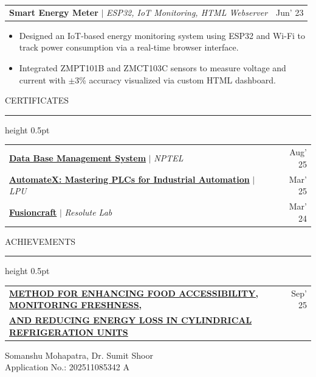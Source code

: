 \documentclass[10pt,a4paper]{article}
\newcommand{\resumeheading}[1]{
    \vspace{6pt}
    {\large\color{resblue} #1}
    \vspace{1pt}
    {\color{resblue}\hrule height 0.5pt}
    \vspace{4pt}
}
\begin{document}
\vspace{2pt}

\begin{tabularx}{\textwidth}{@{}X r@{}}
\textbf{\color{resblue} Smart Energy Meter} $|$ \textit{ESP32, IoT Monitoring, HTML Webserver} & Jun' 23
\end{tabularx}
\begin{itemize}[leftmargin=1.5em, itemsep=0pt, parsep=1pt, topsep=2pt]
    \item Designed an IoT-based energy monitoring system using ESP32 and Wi-Fi to track power consumption via a real-time browser interface.
    \item Integrated ZMPT101B and ZMCT103C sensors to measure voltage and current with $\pm$3\% accuracy visualized via custom HTML dashboard.
\end{itemize}

\resumeheading{CERTIFICATES}

\begin{tabularx}{\textwidth}{@{}X r@{}}
\textbf{\color{resblue} \href{https://drive.google.com/file/d/1cPZTNh-I-6y_1j0XR1dyLbr4Padv7GvN/view?usp=drive_link}{Data Base Management System}} $|$ \textit{NPTEL} & Aug' 25 \\ [1.5pt]
\textbf{\color{resblue} \href{https://drive.google.com/file/d/1PUqcvq8SkgS4APbpqYSwzsYsXNxvOywR/view?usp=drive_link}{AutomateX: Mastering PLCs for Industrial Automation}} $|$ \textit{LPU} & Mar' 25 \\[1.5pt]
\textbf{\color{resblue} \href{https://drive.google.com/file/d/16txdJfMjoQ9aB_c2yHVEDFoT7vu3QOEp/view?usp=drive_link}{Fusioncraft}} $|$ \textit{Resolute Lab} & Mar' 24
\end{tabularx}

\resumeheading{ACHIEVEMENTS}

\begin{tabularx}{\textwidth}{@{}X r@{}}
\textbf{\color{resblue} \href{https://drive.google.com/file/d/1PNy_NGYBe1Dt2zS2FtCkgpTa2ak69WHM/view?usp=drive_link}{METHOD FOR ENHANCING FOOD ACCESSIBILITY, MONITORING FRESHNESS,}} & Sep' 25 \\
\textbf{\color{resblue} \href{https://drive.google.com/file/d/1PNy_NGYBe1Dt2zS2FtCkgpTa2ak69WHM/view?usp=drive_link}{AND REDUCING ENERGY LOSS IN CYLINDRICAL REFRIGERATION UNITS}} & 
\end{tabularx}
Somanshu Mohapatra, Dr. Sumit Shoor \\
Application No.: 202511085342 A
\end{document}
